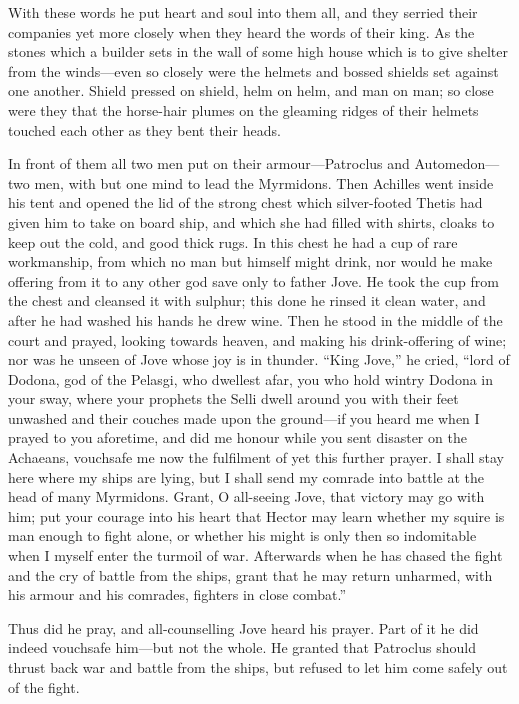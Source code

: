 With these words he put heart and soul into them all, and they serried
their companies yet more closely when they heard the words of their king.
As the stones which a builder sets in the wall of some high house which is
to give shelter from the winds—even so closely were the helmets and
bossed shields set against one another. Shield pressed on shield, helm on
helm, and man on man; so close were they that the horse-hair plumes on the
gleaming ridges of their helmets touched each other as they bent their
heads.

In front of them all two men put on their armour—Patroclus and
Automedon—two men, with but one mind to lead the Myrmidons. Then
Achilles went inside his tent and opened the lid of the strong chest which
silver-footed Thetis had given him to take on board ship, and which she
had filled with shirts, cloaks to keep out the cold, and good thick rugs.
In this chest he had a cup of rare workmanship, from which no man but
himself might drink, nor would he make offering from it to any other god
save only to father Jove. He took the cup from the chest and cleansed it
with sulphur; this done he rinsed it clean water, and after he had washed
his hands he drew wine. Then he stood in the middle of the court and
prayed, looking towards heaven, and making his drink-offering of wine; nor
was he unseen of Jove whose joy is in thunder. “King Jove,” he cried,
“lord of Dodona, god of the Pelasgi, who dwellest afar, you who hold
wintry Dodona in your sway, where your prophets the Selli dwell around you
with their feet unwashed and their couches made upon the ground—if
you heard me when I prayed to you aforetime, and did me honour while you
sent disaster on the Achaeans, vouchsafe me now the fulfilment of yet this
further prayer. I shall stay here where my ships are lying, but I shall
send my comrade into battle at the head of many Myrmidons. Grant, O
all-seeing Jove, that victory may go with him; put your courage into his
heart that Hector may learn whether my squire is man enough to fight
alone, or whether his might is only then so indomitable when I myself
enter the turmoil of war. Afterwards when he has chased the fight and the
cry of battle from the ships, grant that he may return unharmed, with his
armour and his comrades, fighters in close combat.”

Thus did he pray, and all-counselling Jove heard his prayer. Part of it he
did indeed vouchsafe him—but not the whole. He granted that
Patroclus should thrust back war and battle from the ships, but refused to
let him come safely out of the fight.

